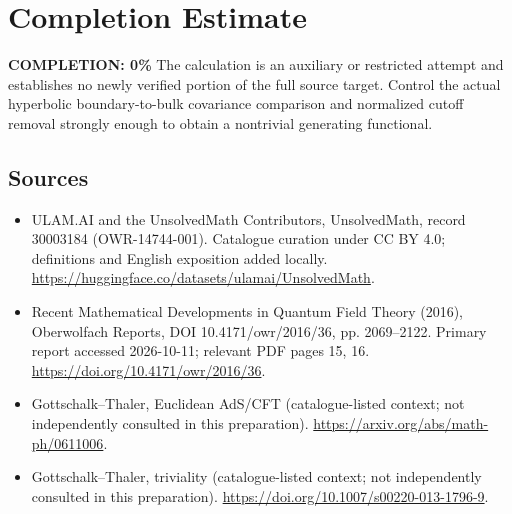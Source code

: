 \documentclass[11pt]{article}
\begin{document}
\section{Completion Estimate}
\noindent\textbf{COMPLETION: 0\%}
The calculation is an auxiliary or restricted attempt and establishes no newly verified portion of the full source target. Control the actual hyperbolic boundary-to-bulk covariance comparison and normalized cutoff removal strongly enough to obtain a nontrivial generating functional.

\subsection{Sources}
\begin{itemize}
\item[\hypertarget{source:30003184:1}{S1}] ULAM.AI and the UnsolvedMath Contributors, UnsolvedMath, record 30003184 (OWR-14744-001). Catalogue curation under CC BY 4.0; definitions and English exposition added locally.
\url{https://huggingface.co/datasets/ulamai/UnsolvedMath}.
\item[\hypertarget{source:30003184:2}{S2}] Recent Mathematical Developments in Quantum Field Theory (2016), Oberwolfach Reports, DOI 10.4171/owr/2016/36, pp. 2069--2122. Primary report accessed 2026-10-11; relevant PDF pages 15, 16.
\url{https://doi.org/10.4171/owr/2016/36}.
\item[\hypertarget{source:30003184:3}{S3}] Gottschalk--Thaler, Euclidean AdS/CFT (catalogue-listed context; not independently consulted in this preparation).
\url{https://arxiv.org/abs/math-ph/0611006}.
\item[\hypertarget{source:30003184:4}{S4}] Gottschalk--Thaler, triviality (catalogue-listed context; not independently consulted in this preparation).
\url{https://doi.org/10.1007/s00220-013-1796-9}.
\end{itemize}
\label{end:30003184}
\end{document}
